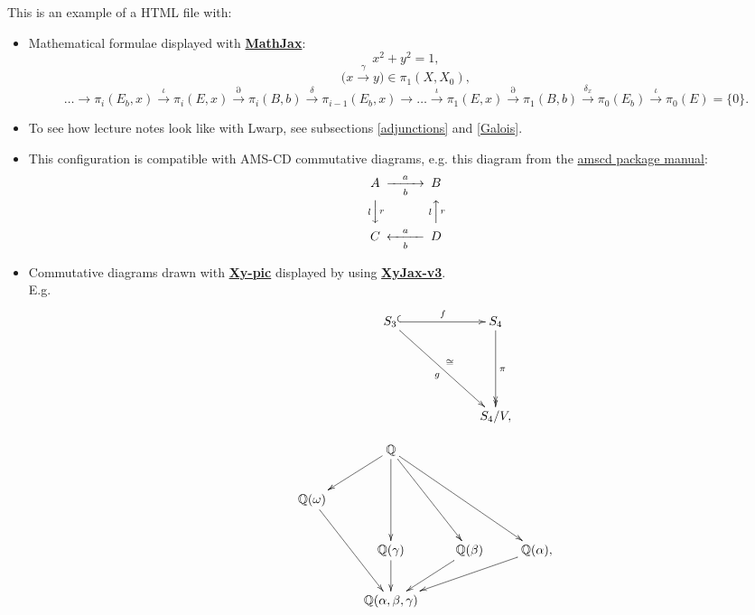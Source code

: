 \documentclass[a4paper,12pt]{article}
\newtheorem{Fundamental Theorem}{Fundamental Theorem}
\newcommand{\ra}[1]{\xrightarrow{#1}}
\newcommand{\Q}{\mathbb{Q}}
\renewcommand{\a}{{\alpha}}
\renewcommand{\b}{{\beta}}
\def \g {\gamma}
\def \w {\omega}
\def \e {\epsilon}
\def \z {\zeta}
\def \d {\partial}
\begin{document}
This is an example of a HTML file with:
\begin{itemize}
\item Mathematical formulae displayed with  \href{https://www.mathjax.org/}{\textbf{MathJax}}:
\begin{equation}\label{test}
   x^2+y^2=1,
\end{equation}
$$\big ( x \ra{ \gamma } y\big) \in \pi_1(X,X_0),
$$
$$
\dots \to \pi_i(E_b,x) \ra{\iota} \pi_i(E,x) \ra{\d}  \pi_i(B,b) \ra{\delta}  \pi_{i-1}(E_b,x) \to \dots
 \ra{\iota} \pi_1(E,x) \ra{\partial}  \pi_1(B,b) \ra{\delta_x} \pi_0(E_b) \ra{\iota} \pi_0(E)=\{0\}.
$$

\item To see how lecture notes look like with Lwarp, see subsections \ref{adjunctions} and \ref{Galois}.
\item 
This configuration is compatible with AMS-CD commutative diagrams, e.g. this diagram from the \href{https://www.jmilne.org/not/Mamscd.pdf}{amscd package manual}:
\[
\begin{CD}
A @>a>b> B\\
@VlVrV @AlArA\\
C @<a<b< D
\end{CD}
\]\begin{quotation}
  \end{quotation}

\item  Commutative diagrams drawn with \href{https://tug.org/applications/Xy-pic/}{\textbf{Xy-pic}} displayed by using \href{https://github.com/sonoisa/XyJax-v3}{\textbf{XyJax-v3}}.\\
E.g.$$\xymatrix@R=60pt@C=60pt{&S_3 \ar@{^{(}->}[r]^f \ar[dr]_{g}^{\cong} &S_4 \ar@{->>}[d]^\pi \\
&&S_4/V,
}
$$

\[
\xymatrix{ && \Q\\ 
& \Q(\w) \ar@{<-}[ur] \\ & & \Q(\g)\ar@{<-}[uu] & \Q(\b)\ar@{<-}[uul] & \Q(\a),\ar@{<-}[uull]\\
&&\Q(\a,\b,\g)\ar@{<-}[uul]\ar@{<-}[u] \ar@{<-}[ur] \ar@{<-}[urr]
} 
\] 


\end{itemize}
\end{document}
